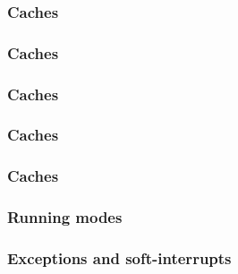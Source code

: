 
\begin{frame}
  \frametitle{Caches}

  \begin{center}
  \end{center}

\end{frame}


\begin{frame}
  \frametitle{Caches}

  \begin{center}
  \end{center}

\end{frame}


\begin{frame}
  \frametitle{Caches}

  \begin{center}
  \end{center}

\end{frame}


\begin{frame}
  \frametitle{Caches}

  \begin{center}
  \end{center}

\end{frame}


\begin{frame}
  \frametitle{Caches}

  \begin{center}
  \end{center}

\end{frame}


\begin{frame}
  \frametitle{Running modes}

\end{frame}


\begin{frame}
  \frametitle{Exceptions and soft-interrupts}

\end{frame}

